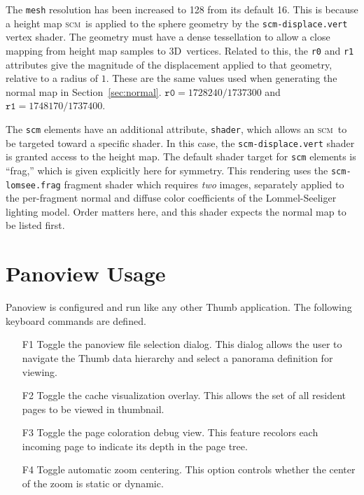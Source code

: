 \documentclass[oneside,10pt]{memoir}
\newcommand{\threed}  {3D}
\newcommand{\scm}     {\textsc{scm}}
\begin{document}
\begin{Spacing}{1.1}
The \texttt{mesh} resolution has been increased to 128 from its default 16. This is because a height map \scm\ is applied to the sphere geometry by the \texttt{scm-displace.vert} vertex shader. The geometry must have a dense tessellation to allow a close mapping from height map samples to \threed\ vertices. Related to this, the \texttt{r0} and \texttt{r1} attributes give the magnitude of the displacement applied to that geometry, relative to a radius of $1$. These are the same values used when generating the normal map in Section~\ref{sec:normal}. $\texttt{r0}=\num{1728240}/\num{1737300}$ and $\texttt{r1}=\num{1748170}/\num{1737400}$.

The \texttt{scm} elements have an additional attribute, \texttt{shader}, which allows an \scm\ to be targeted toward a specific shader. In this case, the \texttt{scm-displace.vert} shader is granted access to the height map. The default shader target for \texttt{scm} elements is ``frag,'' which is given explicitly here for symmetry. This rendering uses the \texttt{scm-lomsee.frag} fragment shader which requires \emph{two} images, separately applied to the per-fragment normal and diffuse color coefficients of the Lommel-Seeliger lighting model. Order matters here, and this shader expects the normal map to be listed first.

\section{Panoview Usage}

Panoview is configured and run like any other Thumb application. The following keyboard commands are defined.

\begin{itemize}
\item[F1] Toggle the panoview file selection dialog. This dialog allows the user to navigate the Thumb data hierarchy and select a panorama definition for viewing.

\item[F2] Toggle the cache visualization overlay. This allows the set of all resident pages to be viewed in thumbnail.

\item[F3] Toggle the page coloration debug view. This feature recolors each incoming page to indicate its depth in the page tree.

\item[F4] Toggle automatic zoom centering. This option controls whether the center of the zoom is static or dynamic.
\end{itemize}


\end{Spacing}
\end{document}
